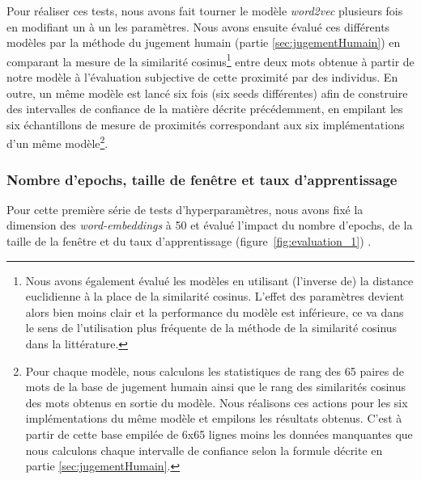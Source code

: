 \documentclass[11pt,french,french]{article}
\let\rmarkdownfootnote\footnote%
\def\footnote{\protect\rmarkdownfootnote}
\begin{document}
Pour réaliser ces tests, nous avons fait tourner le modèle \emph{word2vec} plusieurs fois en modifiant un à un les paramètres. Nous avons ensuite évalué ces différents modèles par la méthode du \og jugement humain \fg{} (partie \ref{sec:jugementHumain}) en comparant la mesure de la similarité cosinus\footnote{Nous avons également évalué les modèles en utilisant (l'inverse de) la distance euclidienne à la place de la similarité cosinus.
  L'effet des paramètres devient alors bien moins clair et la performance du modèle est inférieure, ce va dans le sens de l'utilisation plus fréquente de la méthode de la similarité cosinus dans la littérature.}
entre deux mots obtenue à partir de notre modèle à l'évaluation subjective de cette proximité par des individus.
En outre, un même modèle est lancé six fois (six \og seeds \fg{} différentes) afin de construire des intervalles de confiance de la matière décrite précédemment, en empilant les six échantillons de mesure de proximités correspondant aux six implémentations d'un même modèle\footnote{Pour chaque modèle, nous calculons les statistiques de rang des 65 paires de mots de la base de jugement humain ainsi que le rang des similarités cosinus des mots obtenus en sortie du modèle.
  Nous réalisons ces actions pour les six implémentations du même modèle et empilons les résultats obtenus.
  C'est à partir de cette base empilée de 6x65 lignes moins les données manquantes que nous calculons chaque intervalle de confiance selon la formule décrite en partie \ref{sec:jugementHumain}.}.

\hypertarget{nombre-depochs-taille-de-fenuxeatre-et-taux-dapprentissage}{%
\subsubsection{Nombre d'epochs, taille de fenêtre et taux d'apprentissage}\label{nombre-depochs-taille-de-fenuxeatre-et-taux-dapprentissage}}

Pour cette première série de tests d'hyperparamètres, nous avons fixé la dimension des \emph{word-embeddings} à 50
et évalué l'impact du nombre d'epochs, de la taille de la fenêtre et du taux d'apprentissage (figure~\ref{fig:evaluation_1}) .
\end{document}
